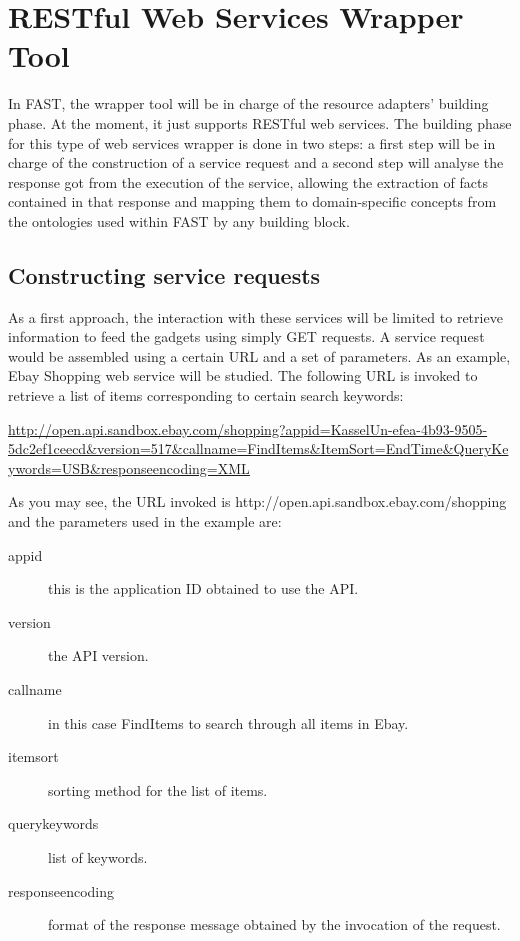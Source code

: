\documentclass{fast_latex}
\begin{document}


\clearpage
\section{RESTful Web Services Wrapper Tool} %
\label{sec:restful_web_services_wrapper_tool}

In FAST, the wrapper tool will be in charge of the resource adapters' building phase. At the moment, it just supports RESTful web services. The building phase for this type of web services wrapper is done in two steps: a first step will be in charge of the construction of a service request and a second step will analyse the response got from the execution of the service, allowing the extraction of facts contained in that response and mapping them to domain-specific concepts from the ontologies used within FAST by any building block.

\subsection{Constructing service requests} %
\label{sub:constructing_service_requests}

As a first approach, the interaction with these services will be limited to retrieve information to feed the gadgets using simply GET requests. A service request would be assembled using a certain URL and a set of parameters. As an example, Ebay Shopping web service will be studied. The following URL is invoked to retrieve a list of items corresponding to certain search keywords:

\url{http://open.api.sandbox.ebay.com/shopping?appid=KasselUn-efea-4b93-9505-5dc2ef1ceecd&version=517&callname=FindItems&ItemSort=EndTime&QueryKeywords=USB&responseencoding=XML}

As you may see, the URL invoked is http://open.api.sandbox.ebay.com/shopping and the parameters used in the example are:
\begin{description}
	\item[appid] this is the application ID obtained to use the API.
	\item[version] the API version.
	\item[callname] in this case FindItems to search through all items in Ebay.
	\item[itemsort] sorting method for the list of items.
	\item[querykeywords] list of keywords.
	\item[responseencoding] format of the response message obtained by the invocation of the request.
\end{description}
\end{document}

